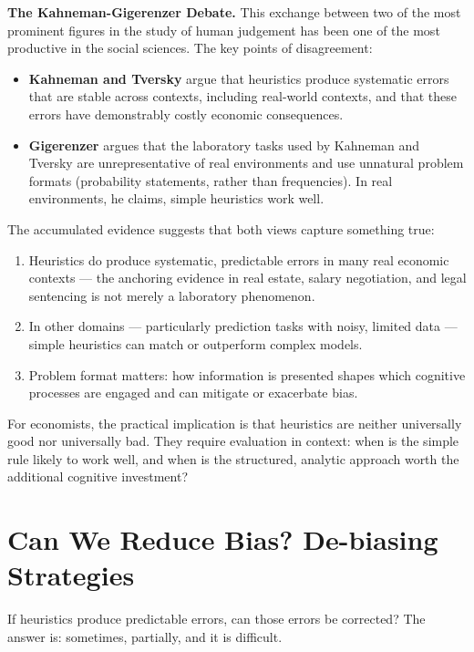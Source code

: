 \documentclass[12pt, letterpaper]{article}
\begin{document}
\textbf{The Kahneman-Gigerenzer Debate.} This exchange between two of the most prominent figures in the study of human judgement has been one of the most productive in the social sciences. The key points of disagreement:

\begin{itemize}
\item \textbf{Kahneman and Tversky} argue that heuristics produce systematic errors that are stable across contexts, including real-world contexts, and that these errors have demonstrably costly economic consequences.
\item \textbf{Gigerenzer} argues that the laboratory tasks used by Kahneman and Tversky are unrepresentative of real environments and use unnatural problem formats (probability statements, rather than frequencies). In real environments, he claims, simple heuristics work well.
\end{itemize}

The accumulated evidence suggests that both views capture something true:

\begin{enumerate}
\item Heuristics do produce systematic, predictable errors in many real economic contexts --- the anchoring evidence in real estate, salary negotiation, and legal sentencing is not merely a laboratory phenomenon.
\item In other domains --- particularly prediction tasks with noisy, limited data --- simple heuristics can match or outperform complex models.
\item Problem format matters: how information is presented shapes which cognitive processes are engaged and can mitigate or exacerbate bias.
\end{enumerate}

For economists, the practical implication is that heuristics are neither universally good nor universally bad. They require evaluation in context: when is the simple rule likely to work well, and when is the structured, analytic approach worth the additional cognitive investment?

\medskip


\section{Can We Reduce Bias? De-biasing Strategies}


If heuristics produce predictable errors, can those errors be corrected? The answer is: sometimes, partially, and it is difficult.
\end{document}
